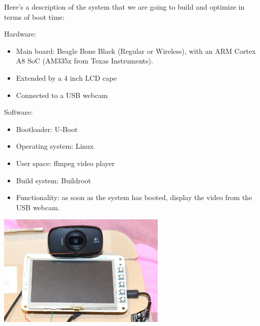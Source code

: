 
Here's a description of the system that we are going to build and
optimize in terms of boot time:

Hardware:
\begin{itemize}
\item Main board: Beagle Bone Black (Regular or Wireless), with an ARM
Cortex A8 SoC (AM335x from Texas Instruments).
\item Extended by a 4 inch LCD cape
\item Connected to a USB webcam
\end{itemize}

Software:
\begin{itemize}
\item Bootloader: U-Boot
\item Operating system: Linux
\item User space: ffmpeg video player
\item Build system: Buildroot
\item Functionality: as soon as the system has booted, display
      the video from the USB webcam.
\end{itemize}

\begin{center}
\includegraphics[width=8cm]{labs/boot-time-goals/goal.jpg}
\end{center}
